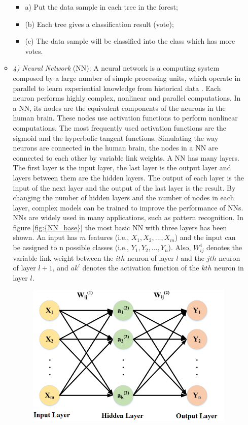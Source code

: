 \begin{itemize}
\begin{itemize}
\begin{itemize}
\item[]a) Put the data sample in each tree in the forest;
\item[](b) Each tree gives a classification result (vote);
\item[](c) The data sample will be classified into the class which has more votes.
\end{itemize}
\item[]\textit{4) Neural Network} (NN): A neural network is a computing system composed by a large number of simple processing units, which operate in parallel to learn experiential knowledge from historical data \cite{Haykin}. Each neuron performs highly complex, nonlinear and parallel computations. In a NN, its nodes are the equivalent components of the neurons in the human brain. These nodes use activation functions to perform nonlinear computations. The most frequently used activation functions are the sigmoid and the hyperbolic tangent functions. Simulating the way neurons are connected in the human brain, the nodes in a NN are connected to each other by variable link weights.
A NN has many layers. The first layer is the input layer, the last layer is the output layer and layers between them are the hidden layers. The output of each layer is the input of the next layer and the output of the last layer is the result. By changing the number of hidden layers and the number of nodes in each layer, complex models can be trained to improve the performance of NNs. NNs are widely used in many applications, such as pattern recognition. In figure \ref{fig:{NN_base}} the most basic NN with three layers has been shown. An input has $m$ features (i.e., $X_{1},X_{2},...,X_{m}$) and the input can be assigned to n possible classes (i.e., $Y_{1},Y_{2},...,Y_{n}$). Also, $W_{ij}^{1}$ denotes the variable link weight between the $ith$ neuron of layer $l$ and the $jth$ neuron of layer $l + 1$, and $ak^{l}$ denotes the activation function of the $kth$ neuron in layer $l$.
\begin{figure}[tb!]
	\centering
	\includegraphics[width=13cm]{figure/NN_base.png}

\end{figure}
\end{itemize}
\end{itemize}
